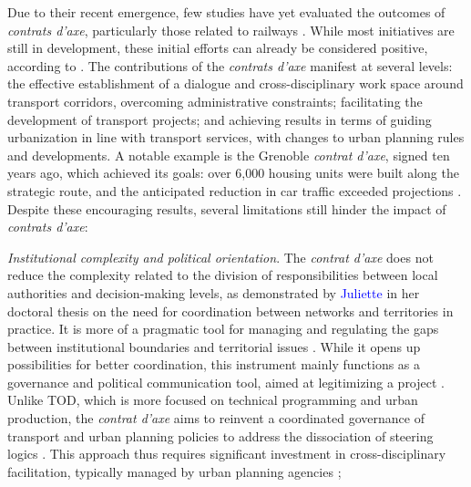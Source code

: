 \begin{refsegment}
Due to their recent emergence, few studies have yet evaluated the outcomes of \textsl{contrats d’axe}, particularly those related to railways \textcolor{blue}{\autocite{fandio_contrat_2023}}. While most initiatives are still in development, these initial efforts can already be considered positive, according to \textcolor{blue}{\textcite[17-18]{cerema_articuler_2015}}. The contributions of the \textsl{contrats d’axe} manifest at several levels: the effective establishment of a dialogue and cross-disciplinary work space around transport corridors, overcoming administrative constraints; facilitating the development of transport projects; and achieving results in terms of guiding urbanization in line with transport services, with changes to urban planning rules and developments. A notable example is the Grenoble \textsl{contrat d’axe}, signed ten years ago, which achieved its goals: over 6,000 housing units were built along the strategic route, and the anticipated reduction in car traffic exceeded projections \textcolor{blue}{\autocites[7]{aurg_contrat_2022}[2]{cerema_outils_2021}}. Despite these encouraging results, several limitations still hinder the impact of \textsl{contrats d’axe}:
    \begin{customitemize}
\item \textsl{Institutional complexity and political orientation}. The \textsl{contrat d’axe} does not reduce the complexity related to the division of responsibilities between local authorities and decision-making levels, as demonstrated by \textcolor{blue}{Juliette} \textcolor{blue}{\textcite[469]{maulat_coordonner_2014}} in her doctoral thesis on the need for coordination between networks and territories in practice. It is more of a pragmatic tool for managing and regulating the gaps between institutional boundaries and territorial issues \textcolor{blue}{\autocite[96]{maulat_contractualiser_2015}}. While it opens up possibilities for better coordination, this instrument mainly functions as a governance and political communication tool, aimed at legitimizing a project \textcolor{blue}{\autocite[84]{gachon_impact_2019}}. Unlike \acrshort{TOD}, which is more focused on technical programming and urban production, the \textsl{contrat d’axe} aims to reinvent a coordinated governance of transport and urban planning policies to address the dissociation of steering logics \textcolor{blue}{\autocites[118]{bentayou_contrat_2015}[20]{afoun_mostaganem_2022}}. This approach thus requires significant investment in cross-disciplinary facilitation, typically managed by urban planning agencies \textcolor{blue}{\autocite[2]{cerema_outils_2021}};

\end{customitemize}
\end{refsegment}
